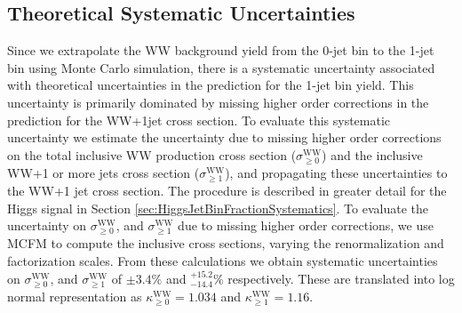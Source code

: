 %

\subsection{Theoretical Systematic Uncertainties}
Since we extrapolate the WW background yield from the 0-jet bin to the 1-jet bin using Monte Carlo
simulation, there is a systematic uncertainty associated with theoretical uncertainties in
the prediction for the 1-jet bin yield. This uncertainty is primarily dominated by missing higher
order corrections in the prediction for the WW+1jet cross section. To evaluate this systematic 
uncertainty we estimate the uncertainty due to missing higher order corrections on the
total inclusive WW production cross section ($\sigma^{\mathrm{WW}}_{\geq 0}$) and the inclusive 
WW+1 or more jets cross section ($\sigma^{\mathrm{WW}}_{\geq 1}$), and propagating these uncertainties 
to the WW+1 jet cross section. The procedure is described in greater detail for the Higgs signal
in Section \ref{sec:HiggsJetBinFractionSystematics}. To evaluate the uncertainty on 
$\sigma^{\mathrm{WW}}_{\geq 0}$, and $\sigma^{\mathrm{WW}}_{\geq 1}$ due to missing higher 
order corrections, we use MCFM \cite{MCFMVVProduction} to compute the inclusive cross sections, 
varying the renormalization and factorization scales. From these calculations we obtain 
systematic uncertainties on $\sigma^{\mathrm{WW}}_{\geq 0}$, and 
$\sigma^{\mathrm{WW}}_{\geq 1}$ of $\pm 3.4\%$ and $^{+15.2}_{-14.4} \%$ respectively. These are translated into
log normal representation as $\kappa^{\mathrm{WW}}_{\geq 0} = 1.034$ and $\kappa^{\mathrm{WW}}_{\geq 1} = 1.16$.

